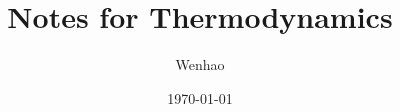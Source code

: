 \documentclass{article}
\begin{document}
\title{Notes for Thermodynamics}
\author{Wenhao}
\date{\today}
\maketitle

\tableofcontents

\newpage




\newpage
\appendix




\end{document}

